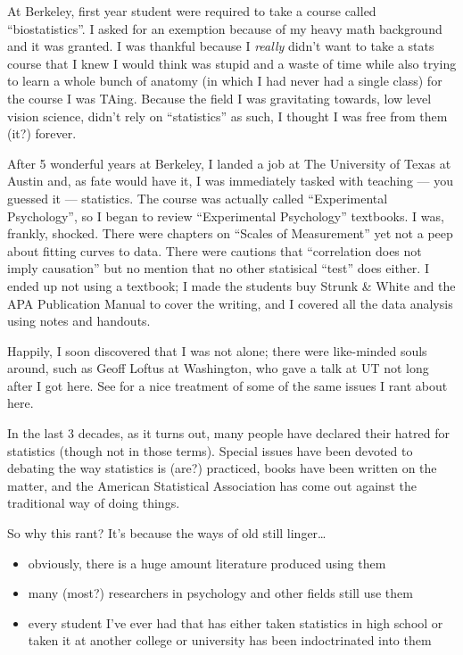 \documentclass[
]{book}
\providecommand{\tightlist}{%
  \setlength{\itemsep}{0pt}\setlength{\parskip}{0pt}}
\begin{document}
At Berkeley, first year student were required to take a course called ``biostatistics''. I asked for an exemption because of my heavy math background and it was granted. I was thankful because I \emph{really} didn't want to take a stats course that I knew I would think was stupid and a waste of time while also trying to learn a whole bunch of anatomy (in which I had never had a single class) for the course I was TAing. Because the field I was gravitating towards, low level vision science, didn't rely on ``statistics'' as such, I thought I was free from them (it?) forever.

After 5 wonderful years at Berkeley, I landed a job at The University of Texas at Austin and, as fate would have it, I was immediately tasked with teaching --- you guessed it --- statistics. The course was actually called ``Experimental Psychology'', so I began to review ``Experimental Psychology'' textbooks. I was, frankly, shocked. There were chapters on ``Scales of Measurement'' yet not a peep about fitting curves to data. There were cautions that ``correlation does not imply causation'' but no mention that no other statisical ``test'' does either. I ended up not using a textbook; I made the students buy Strunk \& White \citeyearpar{strunk} and the APA Publication Manual \citeyearpar{apaman} to cover the writing, and I covered all the data analysis using notes and handouts.

Happily, I soon discovered that I was not alone; there were like-minded souls around, such as Geoff Loftus at Washington, who gave a talk at UT not long after I got here. See \citep{loftus1996} for a nice treatment of some of the same issues I rant about here.

In the last 3 decades, as it turns out, many people have declared their hatred for statistics (though not in those terms). Special issues have been devoted to debating the way statistics is (are?) practiced, books have been written on the matter, and the American Statistical Association has come out against the traditional way of doing things.

So why this rant? It's because the ways of old still linger\ldots{}

\begin{itemize}
\tightlist
\item
  obviously, there is a huge amount literature produced using them
\item
  many (most?) researchers in psychology and other fields still use them
\item
  every student I've ever had that has either taken statistics in high school or taken it at another college or university has been indoctrinated into them
\end{itemize}
\end{document}
